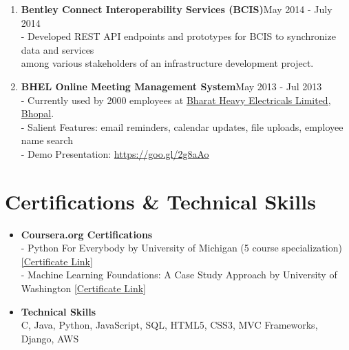 \documentclass{article}
\begin{document}
\begin{enumerate}
    \item \textbf{Bentley Connect Interoperability Services (BCIS)}{\hfill May 2014 - July 2014}\\
    - Developed REST API endpoints and prototypes for BCIS to synchronize data and services\\
    \hspace*{0.7em}among various stakeholders of an infrastructure development project.
    
    \item \textbf{BHEL Online Meeting Management System}{\hfill May 2013 - Jul 2013}\\
    - Currently used by 2000 employees at \href{https://www.bhelbpl.co.in/bplweb_new/}{Bharat Heavy Electricals Limited, Bhopal}.\\
    - Salient Features: email reminders, calendar updates, file uploads, employee name search\\
    - Demo Presentation: \href{https://goo.gl/2g8aAo}{https://goo.gl/2g8aAo}
    
\end{enumerate}


\section*{Certifications \& Technical Skills}
\begin{itemize}
    \item \textbf{Coursera.org Certifications}\\
    - Python For Everybody by University of Michigan (5 course specialization) \href{https://www.coursera.org/account/accomplishments/specialization/2B5PCJGZ9WEE}{[Certificate Link]}\\
    - Machine Learning Foundations: A Case Study Approach by University of Washington \href{https://www.coursera.org/account/accomplishments/certificate/NDVXWMCYKX9N}{[Certificate Link]}
    
    \item \textbf{Technical Skills}\\
    C, Java, Python, JavaScript, SQL, HTML5, CSS3, MVC Frameworks, Django, AWS
\end{itemize}
\end{document}
